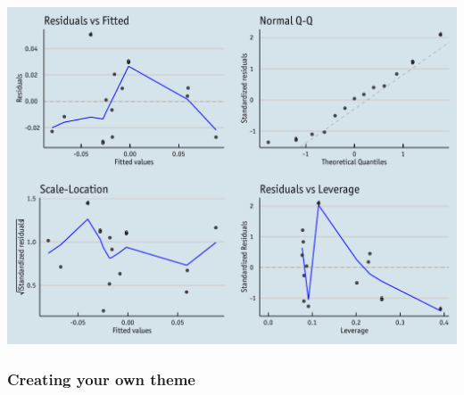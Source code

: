\documentclass[]{article}
\begin{document}
\begin{center}\includegraphics{0_all_posts_pdf/lr_21-1} \end{center}

\subsubsection{Creating your own
theme}\label{creating-your-own-theme-11}
\end{document}
